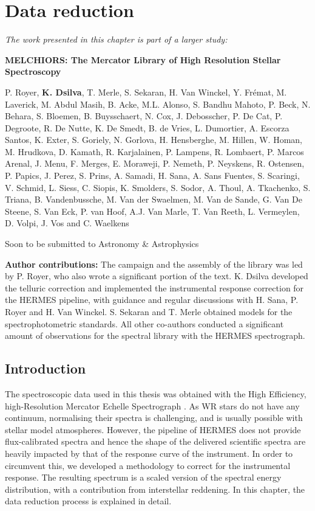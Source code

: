\chapter{Data reduction} \label{ch:data_reduction}

\textit{The work presented in this chapter is part of a larger study:}

\textbf{MELCHIORS: The Mercator Library of High Resolution Stellar Spectroscopy}

P. Royer, \textbf{K. Dsilva}, T. Merle, S. Sekaran, H. Van Winckel, Y. Fr\'emat, M. Laverick, M. Abdul Masih, B. Acke, M.L. Alonso, S. Bandhu Mahoto, P. Beck, N. Behara, S. Bloemen, B. Buysschaert, N. Cox, J. Debosscher, P. De Cat, P. Degroote, R. De Nutte, K. De Smedt, B. de Vries, L. Dumortier, A. Escorza Santos, K. Exter, S. Goriely, N. Gorlova, H. Hensberghe, M. Hillen, W. Homan, M. Hrudkova, D. Kamath, R. Karjalainen, P. Lampens, R. Lombaert, P. Marcos Arenal, J. Menu, F. Merges, E. Moraweji, P. Nemeth, P. Neyskens, R. Ostensen, P. Papics, J. Perez, S. Prins, A. Samadi, H. Sana, A. Sans Fuentes, S. Scaringi, V. Schmid, L. Siess, C. Siopis, K. Smolders, S. Sodor, A. Thoul, A. Tkachenko, S. Triana, B. Vandenbussche, M. Van der Swaelmen, M. Van de Sande, G. Van De Steene, S. Van Eck, P. van Hoof, A.J. Van Marle, T. Van Reeth, L. Vermeylen, D. Volpi, J. Vos and C. Waelkens

Soon to be submitted to Astronomy \& Astrophysics

\textbf{Author contributions:} The campaign and the assembly of the library was led by P. Royer, who also wrote a significant portion of the text. K. Dsilva developed the telluric correction and implemented the instrumental response correction for the HERMES pipeline, with guidance and regular discussions with H. Sana, P. Royer and H. Van Winckel. S. Sekaran and T. Merle obtained models for the spectrophotometric standards. All other co-authors conducted a significant amount of observations for the spectral library with the HERMES spectrograph.

\section{Introduction}

The spectroscopic data used in this thesis was obtained with the High Efficiency, high-Resolution Mercator Echelle Spectrograph \citep[HERMES,][]{raskin_hermes_2011}. As WR stars do not have any continuum, normalising their spectra is challenging, and is usually possible with stellar model atmospheres. However, the pipeline of HERMES does not provide flux-calibrated spectra and hence the shape of the delivered scientific spectra are heavily impacted by that of the response curve of the instrument. In order to circumvent this, we developed a methodology to correct for the instrumental response. The resulting spectrum is a scaled version of the spectral energy distribution, with a contribution from interstellar reddening. In this chapter, the data reduction process is explained in detail.

